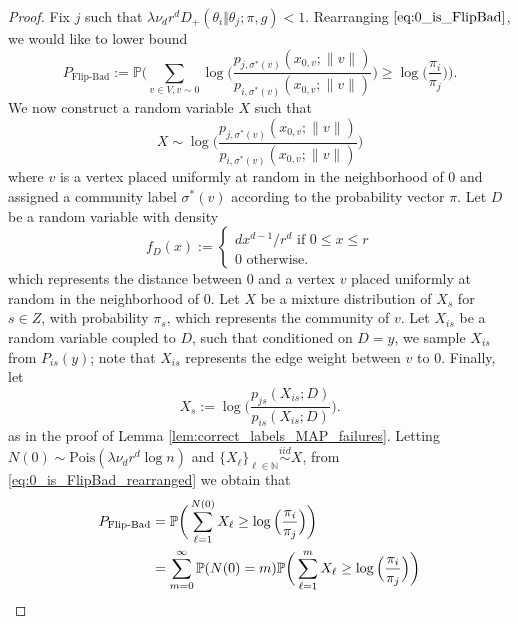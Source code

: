 \documentclass{article}
\renewcommand{\P}{\mathbb{P}}
\newcommand{\N}{\mathbb{N}}
\newcommand{\1}{\mathbbm{1}}
\theoremstyle{definition}
\theoremstyle{plain}
\begin{document}
\begin{proof}
    Fix $j$ such that $\lambda \nu_d r^d D_+(\theta_i \Vert \theta_j; \pi, g) < 1$. Rearranging $\eqref{eq:0_is_FlipBad}$, we would like to lower bound
    \begin{equation}
    \label{eq:0_is_FlipBad_rearranged}
        P_{\text{Flip-Bad}} := \P\bigg( \sum_{v \in V, v \sim 0} \log\Big(\frac{p_{j, \sigma^*(v)}(x_{0, v}; \|v\|)}{p_{i, \sigma^*(v)}(x_{0, v}; \|v\|)}\Big) \geq \log\Big(\frac{\pi_i}{\pi_j}\Big) \bigg).
    \end{equation}
    We now construct a random variable $X$ such that 
    \begin{equation*}
        X \sim \log\bigg(\frac{p_{j, \sigma^*(v)}(x_{0, v}; \|v\|)}{p_{i, \sigma^*(v)}(x_{0, v}; \|v\|)}\bigg)
    \end{equation*}
    where $v$ is a vertex placed uniformly at random in the neighborhood of 0 and assigned a community label $\sigma^*(v)$ according to the probability vector $\pi$. Let $D$ be a random variable with density
    \begin{equation*}
        f_D(x) :=
        \begin{cases}
            dx^{d-1}/r^d \text{ if } 0 \leq x \leq r \\
            0 \text{ otherwise.} 
        \end{cases}
    \end{equation*}
    which represents the distance between 0 and a vertex $v$ placed uniformly at random in the neighborhood of 0. Let $X$ be a mixture distribution of $X_s$ for $s \in Z$, with probability $\pi_s$, which represents the community of $v$. Let $X_{is}$ be a random variable coupled to $D$, such that conditioned on $D = y$, we sample $X_{is}$ from $P_{is}(y)$; note that $X_{is}$ represents the edge weight between $v$ to 0. Finally, let
    \begin{equation*}
        X_s := \log\bigg( \frac{p_{js}(X_{is} ;D)}{p_{is}(X_{is} ;D)} \bigg).
    \end{equation*}   
    as in the proof of Lemma \ref{lem:correct_labels_MAP_failures}. Letting $N(0) \sim \text{Pois}(\lambda \nu_d r^d \log n)$ and $\{X_\ell\}_{\ell \in \N} \overset{iid}{\sim} X$, from \eqref{eq:0_is_FlipBad_rearranged} we obtain that
    \begin{align}
    \label{eq:0_is_FlipBad_LOTP}
        P_{\text{Flip-Bad}} &= \P\bigg( \sum_{\ell = 1}^{N(0)} X_\ell \geq \log\Big(\frac{\pi_i}{\pi_j}\Big) \bigg) \notag \\
        &= \sum_{m = 0}^\infty \P(N(0) = m) \P\bigg( \sum_{\ell = 1}^m X_\ell \geq \log\Big(\frac{\pi_i}{\pi_j}\Big)\bigg)

\end{align}
\end{proof}
\end{document}
